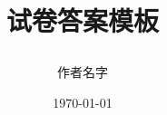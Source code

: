 \def\myTitle{\heiti 试卷答案模板}
\def\myAuthor{作者名字}
% 

\title{

    {\Huge{\textbf{\myTitle}}}}
\author{\myAuthor}
\date{\today}
\maketitle




